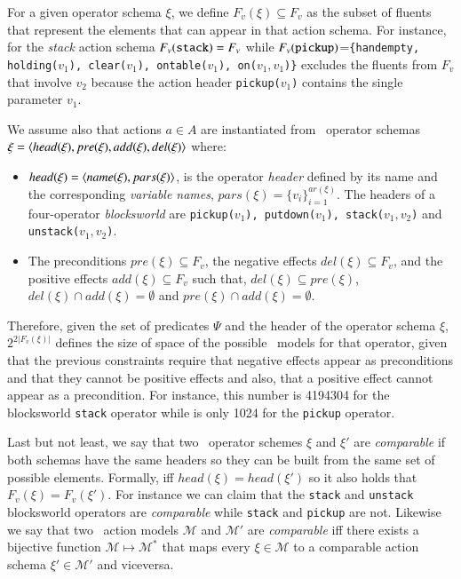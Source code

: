 For a given operator schema $\xi$, we define $F_v(\xi)\subseteq F_v$ as the subset of fluents that represent the elements that can appear in that action schema. For instance, for the {\em stack} action schema $F_v({\tt stack})=F_v$ while $F_v({\tt pickup})$={\small\tt\{handempty, holding($v_1$), clear($v_1$), ontable($v_1$), on($v_1,v_1$)\}} excludes the fluents from $F_v$ that involve $v_2$ because the action header {\small\tt pickup($v_1$)} contains the single parameter $v_1$.

We assume also that actions $a\in A$ are instantiated from \strips\ operator schemas $\xi={\langle head(\xi),pre(\xi),add(\xi),del(\xi) \rangle}$ where:
\begin{itemize}
\item $head(\xi)={\langle name(\xi),pars(\xi) \rangle}$, is the operator {\em header} defined by its name and the corresponding {\em variable names}, $pars(\xi)=\{v_i\}_{i=1}^{ar(\xi)}$. The headers of a four-operator {\em blocksworld} are {\small\tt pickup($v_1$), putdown($v_1$), stack($v_1,v_2$)} and {\small\tt unstack($v_1,v_2$)}.
\item The preconditions $pre(\xi)\subseteq F_v$, the negative effects $del(\xi)\subseteq F_v$, and the positive effects $add(\xi)\subseteq F_v$ such that, $del(\xi)\subseteq pre(\xi)$, $del(\xi)\cap add(\xi)=\emptyset$ and $pre(\xi)\cap add(\xi)=\emptyset$.
\end{itemize}
Therefore, given the set of predicates $\Psi$ and the header of the operator schema $\xi$, $2^{2|F_v(\xi)|}$ defines the size of space of the possible \strips\ models for that operator, given that the previous constraints require that negative effects appear as preconditions and that they cannot be positive effects and also, that a positive effect cannot appear as a precondition. For instance, this number is 4194304 for the blocksworld {\tt stack} operator while is only 1024 for the {\tt pickup} operator.

Last but not least, we say that two \strips\ operator schemes $\xi$ and $\xi'$ are {\em comparable} if both schemas have the same headers so they can be built from the same set of possible elements. Formally, iff $head(\xi)=head(\xi')$ so it also holds that $F_v(\xi)=F_v(\xi')$. For instance we can claim that the {\tt stack} and {\tt unstack} blocksworld operators are {\em comparable} while  {\tt stack} and {\tt pickup} are not. Likewise we say that two \strips\ action models $\mathcal{M}$ and $\mathcal{M}'$ are {\em comparable} iff there exists a bijective function $\mathcal{M} \mapsto \mathcal{M}^*$ that maps every $\xi\in\mathcal{M}$ to a comparable action schema $\xi'\in\mathcal{M'}$ and viceversa.



